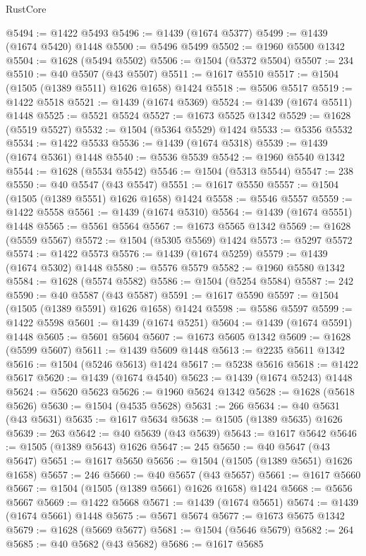\begin{lexlean}{RustCore}
\begin{coremodule}
@5494 := @1422 @5493
@5496 := @1439 (@1674 @5377)
@5499 := @1439 (@1674 @5420) @1448
@5500 := @5496 @5499
@5502 := @1960 @5500 @1342
@5504 := @1628 (@5494 @5502)
@5506 := @1504 (@5372 @5504)
@5507 := 234
@5510 := @40 @5507 (@43 @5507)
@5511 := @1617 @5510
@5517 := @1504 (@1505 (@1389 @5511) @1626 @1658) @1424
@5518 := @5506 @5517
@5519 := @1422 @5518
@5521 := @1439 (@1674 @5369)
@5524 := @1439 (@1674 @5511) @1448
@5525 := @5521 @5524
@5527 := @1673 @5525 @1342
@5529 := @1628 (@5519 @5527)
@5532 := @1504 (@5364 @5529) @1424
@5533 := @5356 @5532
@5534 := @1422 @5533
@5536 := @1439 (@1674 @5318)
@5539 := @1439 (@1674 @5361) @1448
@5540 := @5536 @5539
@5542 := @1960 @5540 @1342
@5544 := @1628 (@5534 @5542)
@5546 := @1504 (@5313 @5544)
@5547 := 238
@5550 := @40 @5547 (@43 @5547)
@5551 := @1617 @5550
@5557 := @1504 (@1505 (@1389 @5551) @1626 @1658) @1424
@5558 := @5546 @5557
@5559 := @1422 @5558
@5561 := @1439 (@1674 @5310)
@5564 := @1439 (@1674 @5551) @1448
@5565 := @5561 @5564
@5567 := @1673 @5565 @1342
@5569 := @1628 (@5559 @5567)
@5572 := @1504 (@5305 @5569) @1424
@5573 := @5297 @5572
@5574 := @1422 @5573
@5576 := @1439 (@1674 @5259)
@5579 := @1439 (@1674 @5302) @1448
@5580 := @5576 @5579
@5582 := @1960 @5580 @1342
@5584 := @1628 (@5574 @5582)
@5586 := @1504 (@5254 @5584)
@5587 := 242
@5590 := @40 @5587 (@43 @5587)
@5591 := @1617 @5590
@5597 := @1504 (@1505 (@1389 @5591) @1626 @1658) @1424
@5598 := @5586 @5597
@5599 := @1422 @5598
@5601 := @1439 (@1674 @5251)
@5604 := @1439 (@1674 @5591) @1448
@5605 := @5601 @5604
@5607 := @1673 @5605 @1342
@5609 := @1628 (@5599 @5607)
@5611 := @1439 @5609 @1448
@5613 := @2235 @5611 @1342
@5616 := @1504 (@5246 @5613) @1424
@5617 := @5238 @5616
@5618 := @1422 @5617
@5620 := @1439 (@1674 @4540)
@5623 := @1439 (@1674 @5243) @1448
@5624 := @5620 @5623
@5626 := @1960 @5624 @1342
@5628 := @1628 (@5618 @5626)
@5630 := @1504 (@4535 @5628)
@5631 := 266
@5634 := @40 @5631 (@43 @5631)
@5635 := @1617 @5634
@5638 := @1505 (@1389 @5635) @1626
@5639 := 263
@5642 := @40 @5639 (@43 @5639)
@5643 := @1617 @5642
@5646 := @1505 (@1389 @5643) @1626
@5647 := 245
@5650 := @40 @5647 (@43 @5647)
@5651 := @1617 @5650
@5656 := @1504 (@1505 (@1389 @5651) @1626 @1658)
@5657 := 246
@5660 := @40 @5657 (@43 @5657)
@5661 := @1617 @5660
@5667 := @1504 (@1505 (@1389 @5661) @1626 @1658) @1424
@5668 := @5656 @5667
@5669 := @1422 @5668
@5671 := @1439 (@1674 @5651)
@5674 := @1439 (@1674 @5661) @1448
@5675 := @5671 @5674
@5677 := @1673 @5675 @1342
@5679 := @1628 (@5669 @5677)
@5681 := @1504 (@5646 @5679)
@5682 := 264
@5685 := @40 @5682 (@43 @5682)
@5686 := @1617 @5685

\end{coremodule}
\end{lexlean}
